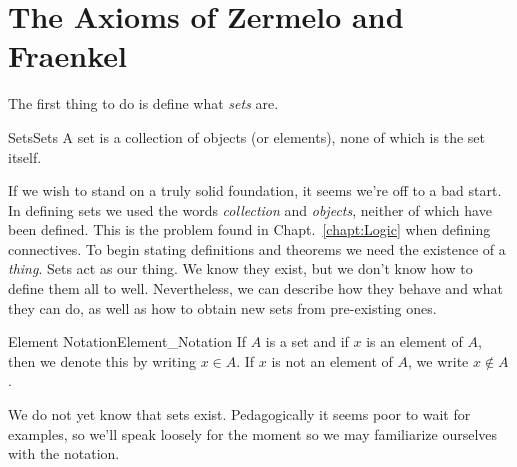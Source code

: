 \section{The Axioms of Zermelo and Fraenkel}
    The first thing to do is define what \textit{sets} are.
    \begin{fdefinition}{Sets}{Sets}
        A \gls{set} is a collection of objects (or elements), none of which is
        the set itself.
    \end{fdefinition}
    If we wish to stand on a truly solid foundation, it seems we're off to a bad
    start. In defining sets we used the words \textit{collection} and
    \textit{objects}, neither of which have been defined. This is the problem
    found in Chapt.~\ref{chapt:Logic} when defining connectives. To begin
    stating definitions and theorems we need the existence of a \textit{thing}.
    Sets act as our thing. We know they exist, but we don't know how to define
    them all to well. Nevertheless, we can describe how they behave and what
    they can do, as well as how to obtain new sets from pre-existing ones.
    \begin{fnotation}{Element Notation}{Element_Notation}
        If $A$ is a \gls{set} and if $x$ is an element of
        $A$, then we denote this by writing $x\in{A}$. If $x$ is not an element
        of $A$, we write $x\notin{A}$.
    \end{fnotation}
    We do not yet know that sets exist. Pedagogically it seems poor to wait
    for examples, so we'll speak loosely for the moment so we may familiarize
    ourselves with the notation.
